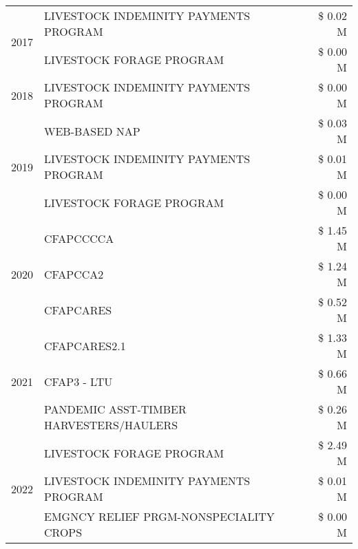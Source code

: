 \begin{tabular}{llr}
\cline{1-3}
\multirow[t]{2}{*}{2017} & LIVESTOCK INDEMINITY PAYMENTS PROGRAM & \$ 0.02 M \\
 & LIVESTOCK FORAGE PROGRAM & \$ 0.00 M \\
\cline{1-3}
2018 & LIVESTOCK INDEMINITY PAYMENTS PROGRAM & \$ 0.00 M \\
\cline{1-3}
\multirow[t]{3}{*}{2019} & WEB-BASED NAP & \$ 0.03 M \\
 & LIVESTOCK INDEMINITY PAYMENTS PROGRAM & \$ 0.01 M \\
 & LIVESTOCK FORAGE PROGRAM & \$ 0.00 M \\
\cline{1-3}
\multirow[t]{3}{*}{2020} & CFAPCCCCA & \$ 1.45 M \\
 & CFAPCCA2 & \$ 1.24 M \\
 & CFAPCARES & \$ 0.52 M \\
\cline{1-3}
\multirow[t]{3}{*}{2021} & CFAPCARES2.1 & \$ 1.33 M \\
 & CFAP3 - LTU & \$ 0.66 M \\
 & PANDEMIC ASST-TIMBER HARVESTERS/HAULERS & \$ 0.26 M \\
\cline{1-3}
\multirow[t]{3}{*}{2022} & LIVESTOCK FORAGE PROGRAM & \$ 2.49 M \\
 & LIVESTOCK INDEMINITY PAYMENTS PROGRAM & \$ 0.01 M \\
 & EMGNCY RELIEF PRGM-NONSPECIALITY CROPS & \$ 0.00 M \\
\cline{1-3}
\bottomrule
\end{tabular}
